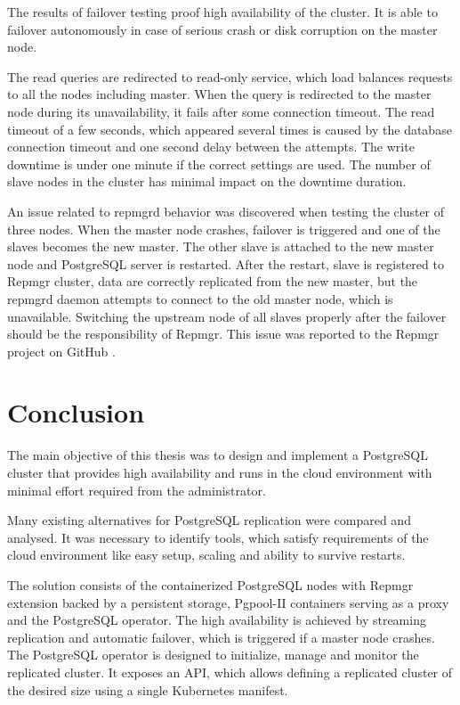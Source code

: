 \documentclass[
  digital, %
  twoside, %
  table,   %
  lof,     %
  lot,     %
]{fithesis3}
\begin{document}
The results of failover testing proof high availability of the cluster. It is able to failover autonomously in case of serious crash or disk corruption on the master node.

The read queries are redirected to read-only service, which load balances requests to all the nodes including master. When the query is redirected to the master node during its unavailability, it fails after some connection timeout.
The read timeout of a few seconds, which appeared several times is caused by the database connection timeout and one second delay between the attempts. The write downtime is under one minute if the correct settings are used. The number of slave nodes in the cluster has minimal impact on the downtime duration.

An issue related to repmgrd behavior was discovered when testing the cluster of three nodes. When the master node crashes, failover is triggered and one of the slaves becomes the new master. The other slave is attached to the new master node and PostgreSQL server is restarted. After the restart, slave is registered to Repmgr cluster, data are correctly replicated from the new master, but the repmgrd daemon attempts to connect to the old master node, which is unavailable. Switching the upstream node of all slaves properly after the failover should be the responsibility of Repmgr. This issue was reported to the Repmgr project on GitHub \cite{repmgrd_issue}. 

\chapter{Conclusion} \label{chap:conclusion}
The main objective of this thesis was to design and implement a PostgreSQL cluster that provides high availability and runs in the cloud environment with minimal effort required from the administrator.

Many existing alternatives for PostgreSQL replication were compared and analysed. It was necessary to identify tools, which satisfy requirements of the cloud environment like easy setup, scaling and ability to survive restarts.

The solution consists of the containerized PostgreSQL nodes with Repmgr extension backed by a persistent storage, Pgpool-II containers serving as a proxy and the PostgreSQL operator. The high availability is achieved by streaming replication and automatic failover, which is triggered if a master node crashes. The PostgreSQL operator is designed to initialize, manage and monitor the replicated cluster. It exposes an API, which allows defining a replicated cluster of the desired size using a single Kubernetes manifest.
\end{document}
